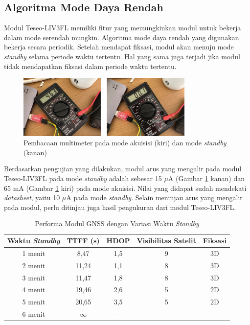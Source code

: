 \documentclass[conference]{IEEEtran}
\begin{document}
\subsection{Algoritma Mode Daya Rendah}
Modul Teseo-LIV3FL memiliki fitur yang memungkinkan modul untuk bekerja dalam mode serendah mungkin. Algoritma mode daya rendah yang digunakan bekerja secara periodik. Setelah mendapat fiksasi, modul akan menuju mode \textit{standby} selama periode waktu tertentu. Hal yang sama juga terjadi jika modul tidak mendapatkan fiksasi dalam periode waktu tertentu. 

\begin{figure}[htb!]
	\centering
	\includegraphics[width=8.7cm]{low-power-result.jpg}
	\caption{Pembacaan multimeter pada mode akuisisi (kiri) dan mode \textit{standby} (kanan)}
	\label{Fig: 4-low-power-result}
\end{figure}

Berdasarkan pengujian yang dilakukan, modul arus yang mengalir pada modul Teseo-LIV3FL pada mode \textit{standby} adalah sebesar 15 $\mu$A (Gambar \ref{Fig: 4-low-power-result} kanan) dan 65 mA (Gambar \ref{Fig: 4-low-power-result} kiri) pada mode akuisisi. Nilai yang didapat sudah mendekati \textit{datasheet}, yaitu 10 $\mu$A pada mode \textit{standby}. Selain meninjau arus yang mengalir pada modul, perlu ditinjau juga hasil pengukuran dari modul Teseo-LIV3FL.

\begin{table}[h]
	\centering
	\renewcommand{\arraystretch}{1.5}
	\caption{Performa Modul GNSS dengan Variasi Waktu \textit{Standby}}
	\label{tab: 4-lpm-var}
	\begin{tabular}{ccccc}
		\hline
		\textbf{Waktu \textit{Standby}} &\textbf{TTFF (s)} & \textbf{HDOP} & \textbf{Visibilitas Satelit} & \textbf{Fiksasi}\\
		\hline 
		1 menit & 8,47 & 1,5 & 9 & 3D\\
		2 menit & 11,24 & 1,1 & 8 & 3D\\
		3 menit & 11,47 & 1,8 & 8 & 3D\\
		4 menit & 19,46 & 2,6 & 5 & 2D\\
		5 menit & 20,65 & 3,5 & 5 & 2D\\
		6 menit & $\infty$ & - & - & -\\
		\hline
	\end{tabular}
\end{table}
\end{document}
